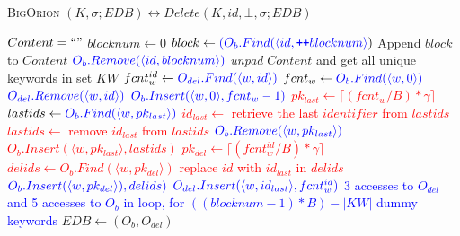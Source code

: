 \documentclass[sigconf]{acmart}
\newcommand{\pair}[2]{{\langle \ensuremath{#1, #2} \rangle}}
\newcommand{\vol}[1]{\lvert{#1}\rvert}
\newcommand{\ceil}[1]{\lceil #1 \rceil}
\newcommand{\BigOrion}{\textsc{BigOrion }}
\newcommand{\tblue}[1]{\textcolor{blue}{#1}}
\begin{document}
\begin{algorithm}
\caption{\BigOrion$(K,\sigma;EDB) \leftrightarrow Delete(K,id,\bot,\sigma;EDB)$}\label{alg:bodel}
\begin{algorithmic}[1]
 \State $Content=``"$ 
 \State $blocknum \gets 0$ 
 \Repeat \label{bodelalg:repeat}
    \State $block \gets\tblue{ (O_{b}.Find(\pair{id}{\texttt{++}blocknum}})$
     \State Append $block$ to $Content$  \label{bodelalg:appendcont}
    \State $\tblue{O_{b}.Remove(\pair{id}{blocknum})}$  \label{bodelalg:removeblk}
 \label{bodelalg:until}
\State \emph{unpad} $Content$ and get all unique keywords in set $KW$ \label{bodelalg:uniqkey}
  \label{bodelalg:foreachkey}
\State $fcnt_{w}^{id} \gets \tblue{ O_{del}.Find(\pair{w}{id})}$  \label{bodelalg:getfcntidw}
\State $fcnt_{w} \gets \tblue{O_{b}.Find(\pair{w}{0})}$ \label{bodelalg:getfcntw}
\State $\tblue{O_{del}.Remove(\pair{w}{id})}$ \label{bodelalg:removeidw}
 \State $\tblue{O_{b}.Insert(\pair{w}{0},fcnt_{w}-1)}$ \label{bodelalg:setfcntw}
\State \textcolor{red}{$pk_{last} \gets \ceil{(fcnt_w/B)*\gamma}$ }\label{bodelalg:getpklast}
\State $lastids \gets \tblue{ O_{b}.Find(\pair{w}{pk_{last}})}$\label{bodelalg:getlastids}
\State \textcolor{red}{$id_{last} \gets$ retrieve the last $identifier$ from $lastids$ }\label{bodelalg:getlastid}
\State \textcolor{red}{$lastids \gets$ remove $id_{last}$ from $lastids$}\label{bodelalg:updtlastids}
\If{\textcolor{red}{$lastids = NULL$}}
 \State $\textcolor{blue}{O_{b}.Remove(\pair{w}{pk_{last}})}$\label{bodelalg:remlastids}
 \Else \State \textcolor{red}{{$O_{b}.Insert(\pair{w}{pk_{last}},lastids)$}}\label{bodelalg:setlastids}
 \EndIf \label{bodelalg:setlastidsendif}
   
  \State \textcolor{red}{$pk_{del} \gets \ceil{(fcnt_w^{id}/B)*\gamma} $} \label{bodelalg:getpkdel}
  \State \textcolor{red}{$delids \gets O_{b}.Find(\pair{w}{pk_{del}})$}\label{bodelalg:getdelids}
  \State \textcolor{red}{replace $id$ with $id_{last}$ in $delids$}\label{bodelalg:insdelids}
   \State $\tblue{O_{b}.Insert(\pair{w}{pk_{del}}),delids)}$\label{bodelalg:updtdelids}
    \State $\tblue{O_{del}.Insert(\pair{w}{id_{last}},fcnt_{w}^{id})}$\label{bodelalg:updtfcntidw}
  \EndIf
\EndFor
\State \tblue{3 accesses to $O_{del}$ and 5 accesses to $O_{b}$ in loop, for $((blocknum-1)*B) - \vol{KW}$ dummy keywords}\label{bodelalg:fakeaccs}
\State $EDB \gets (O_{b},O_{del})$
\end{algorithmic}
\label{Algo:BigorionDelete}
\end{algorithm}
\end{document}

